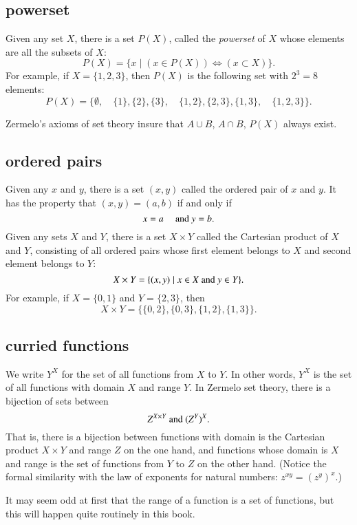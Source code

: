 \documentclass[cup9a]{cupbook}
\begin{document}
\subsection{powerset}

Given any set $X$, there is a set $P(X)$, called the {\it powerset} of $X$ whose elements are  all the subsets of $X$:
$$
P(X) = \{x\mid (x\in P(X))\Leftrightarrow (x\subset X)\}.
$$
For example, if $X = \{1,2,3\}$, then $P(X)$ is the following set with
$2^3 = 8$ elements:
$$P(X) = \{\emptyset, \quad \{1\},\{2\},\{3\},\quad
          \{1,2\},\{2,3\},\{1,3\},\quad \{1,2,3\} \}.$$


Zermelo's axioms of set theory insure that $A\cup B$, $A\cap B$, $P(X)$ always exist.

\subsection{ordered pairs}

Given any $x$ and $y$, there is a set $(x,y)$ called the ordered pair
of $x$ and $y$.  It has the property that $(x,y)=(a,b)$ if and only if
$$
x = a \quad \hbox{ and } y = b.
$$
Given any sets $X$ and $Y$, there is a set $X \times Y$ called the Cartesian product of $X$ and $Y$, consisting of all ordered pairs whose first element belongs to $X$ and second element belongs to $Y$:
$$
X\times Y  = \{(x,y) \mid x\in X\hbox{ and } y \in Y\}.
$$
For example, if $X = \{0,1\}$ and $Y=\{2,3\}$, then
$$
X\times Y = \{\{0,2\},\{0,3\},\{1,2\},\{1,3\}\}.
$$

\subsection{curried functions}

We write $Y^X$ for the set of all functions from $X$ to $Y$.  In other
words, $Y^X$ is the set of all functions with domain $X$ and range $Y$.
In Zermelo set theory, there is a bijection of sets between
\begin{equation}
  Z^{X\times Y}\hbox { and } (Z^Y)^X.\label{eqn:curry}
\end{equation}
That is, there is a bijection between functions with domain is the Cartesian product $X\times Y$ and range $Z$ on the one hand, and functions whose domain is $X$ and range is the set of functions from $Y$ to $Z$ on the other hand.
(Notice the formal similarity with the law of exponents for natural numbers:
$z^{x y} = (z^y)^x$.)

It may seem odd at first that the range of a function is a set of functions, but this will happen quite routinely in this book.
\end{document}
